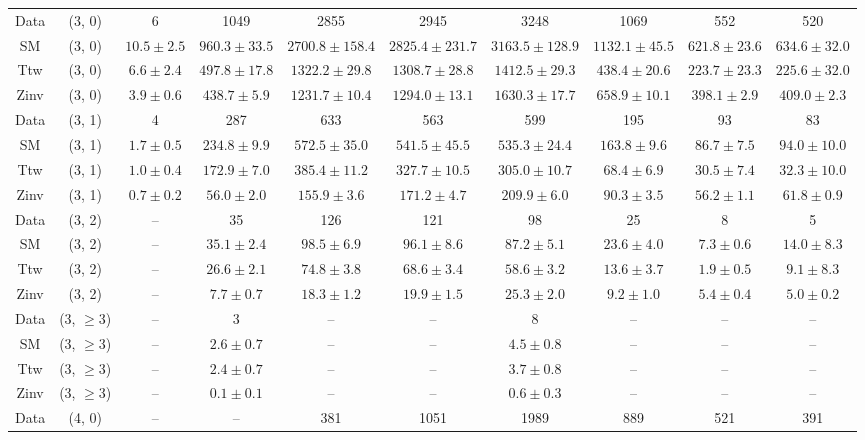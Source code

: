 \begin{table}[h!]
{\begin{tabular}{cccccccccc}
	Data & (3, 0) & 6 & 1049 & 2855 & 2945 & 3248 & 1069 & 552 & 520 \\[0.5ex] 
	SM & (3, 0) & $10.5\pm 2.5$ & $960.3\pm 33.5$ & $2700.8\pm 158.4$ & $2825.4\pm 231.7$ & $3163.5\pm 128.9$ & $1132.1\pm 45.5$ & $621.8\pm 23.6$ & $634.6\pm 32.0$ \\[0.5ex] 
	Ttw & (3, 0) & $6.6\pm 2.4$ & $497.8\pm 17.8$ & $1322.2\pm 29.8$ & $1308.7\pm 28.8$ & $1412.5\pm 29.3$ & $438.4\pm 20.6$ & $223.7\pm 23.3$ & $225.6\pm 32.0$ \\[0.5ex] 
	Zinv & (3, 0) & $3.9\pm 0.6$ & $438.7\pm 5.9$ & $1231.7\pm 10.4$ & $1294.0\pm 13.1$ & $1630.3\pm 17.7$ & $658.9\pm 10.1$ & $398.1\pm 2.9$ & $409.0\pm 2.3$ \\[0.5ex] 
	Data & (3, 1) & 4 & 287 & 633 & 563 & 599 & 195 & 93 & 83 \\[0.5ex] 
	SM & (3, 1) & $1.7\pm 0.5$ & $234.8\pm 9.9$ & $572.5\pm 35.0$ & $541.5\pm 45.5$ & $535.3\pm 24.4$ & $163.8\pm 9.6$ & $86.7\pm 7.5$ & $94.0\pm 10.0$ \\[0.5ex] 
	Ttw & (3, 1) & $1.0\pm 0.4$ & $172.9\pm 7.0$ & $385.4\pm 11.2$ & $327.7\pm 10.5$ & $305.0\pm 10.7$ & $68.4\pm 6.9$ & $30.5\pm 7.4$ & $32.3\pm 10.0$ \\[0.5ex] 
	Zinv & (3, 1) & $0.7\pm 0.2$ & $56.0\pm 2.0$ & $155.9\pm 3.6$ & $171.2\pm 4.7$ & $209.9\pm 6.0$ & $90.3\pm 3.5$ & $56.2\pm 1.1$ & $61.8\pm 0.9$ \\[0.5ex] 
	Data & (3, 2) & -- & 35 & 126 & 121 & 98 & 25 & 8 & 5 \\[0.5ex] 
	SM & (3, 2) & -- & $35.1\pm 2.4$ & $98.5\pm 6.9$ & $96.1\pm 8.6$ & $87.2\pm 5.1$ & $23.6\pm 4.0$ & $7.3\pm 0.6$ & $14.0\pm 8.3$ \\[0.5ex] 
	Ttw & (3, 2) & -- & $26.6\pm 2.1$ & $74.8\pm 3.8$ & $68.6\pm 3.4$ & $58.6\pm 3.2$ & $13.6\pm 3.7$ & $1.9\pm 0.5$ & $9.1\pm 8.3$ \\[0.5ex] 
	Zinv & (3, 2) & -- & $7.7\pm 0.7$ & $18.3\pm 1.2$ & $19.9\pm 1.5$ & $25.3\pm 2.0$ & $9.2\pm 1.0$ & $5.4\pm 0.4$ & $5.0\pm 0.2$ \\[0.5ex] 
	Data & (3, $\ge3$) & -- & 3 & -- & -- & 8 & -- & -- & -- \\[0.5ex] 
	SM & (3, $\ge3$) & -- & $2.6\pm 0.7$ & -- & -- & $4.5\pm 0.8$ & -- & -- & -- \\[0.5ex] 
	Ttw & (3, $\ge3$) & -- & $2.4\pm 0.7$ & -- & -- & $3.7\pm 0.8$ & -- & -- & -- \\[0.5ex] 
	Zinv & (3, $\ge3$) & -- & $0.1\pm 0.1$ & -- & -- & $0.6\pm 0.3$ & -- & -- & -- \\[0.5ex] 
	Data & (4, 0) & -- & -- & 381 & 1051 & 1989 & 889 & 521 & 391 \\[0.5ex] 

\end{tabular}}
\end{table}
